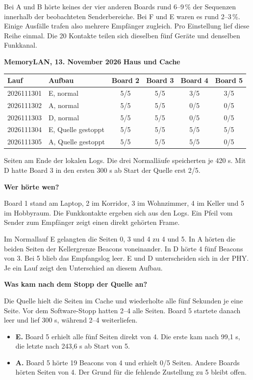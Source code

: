 \documentclass[a4paper,11pt]{article}
\begin{document}
Bei A und B hörte keines der vier anderen Boards rund 6--9\,\% der Sequenzen innerhalb der beobachteten Senderbereiche. Bei F und E waren es rund 2--3\,\%. Einige Ausfälle trafen also mehrere Empfänger zugleich. Pro Einstellung lief diese Reihe einmal. Die 20 Kontakte teilen sich dieselben fünf Geräte und denselben Funkkanal.

\newpage
\textbf{MemoryLAN, 13. November 2026} \hfill \textbf{Haus und Cache}

\begin{center}
\small
\begin{tabular}{llcccc}\toprule
Lauf & Aufbau & Board 2 & Board 3 & Board 4 & Board 5 \\ \midrule
2026111301 & E, normal & 5/5 & 5/5 & 3/5 & 3/5 \\
2026111302 & A, normal & 5/5 & 5/5 & 0/5 & 0/5 \\
2026111303 & D, normal & 5/5 & 5/5 & 0/5 & 0/5 \\
2026111304 & E, Quelle gestoppt & 5/5 & 5/5 & 5/5 & 5/5 \\
2026111305 & A, Quelle gestoppt & 5/5 & 5/5 & 5/5 & 0/5 \\
\bottomrule
\end{tabular}
\end{center}

{\small Seiten am Ende der lokalen Logs. Die drei Normalläufe speicherten je 420 s. Mit D hatte Board 3 in den ersten 300 s ab Start der Quelle erst 2/5.}

\textbf{Wer hörte wen?}

Board 1 stand am Laptop, 2 im Korridor, 3 im Wohnzimmer, 4 im Keller und 5 im Hobbyraum. Die Funkkontakte ergeben sich aus den Logs. Ein Pfeil vom Sender zum Empfänger zeigt einen direkt gehörten Frame.

Im Normallauf E gelangten die Seiten 0, 3 und 4 zu 4 und 5. In A hörten die beiden Seiten der Kellergrenze Beacons voneinander. In D hörte 4 fünf Beacons von 3. Bei 5 blieb das Empfangslog leer. E und D unterscheiden sich in der PHY. Je ein Lauf zeigt den Unterschied an diesem Aufbau.

\textbf{Was kam nach dem Stopp der Quelle an?}

Die Quelle hielt die Seiten im Cache und wiederholte alle fünf Sekunden je eine Seite. Vor dem Software-Stopp hatten 2--4 alle Seiten. Board 5 startete danach leer und lief 300 s, während 2--4 weiterliefen.

\begin{itemize}
\item \textbf{E.} Board 5 erhielt alle fünf Seiten direkt von 4. Die erste kam nach 99,1 s, die letzte nach 243,6 s ab Start von 5.
\item \textbf{A.} Board 5 hörte 19 Beacons von 4 und erhielt 0/5 Seiten. Andere Boards hörten Seiten von 4. Der Grund für die fehlende Zustellung zu 5 bleibt offen.
\end{itemize}
\end{document}
